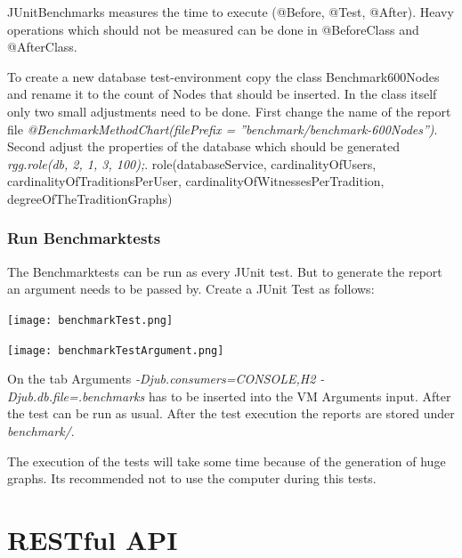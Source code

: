 \documentclass[11pt,fleqn,openany]{book} %
\begin{document}
\begin{remark}
JUnitBenchmarks measures the time to execute (@Before, @Test, @After). Heavy operations which should not be measured can be done in @BeforeClass and @AfterClass.
\end{remark}

To create a new database test-environment copy the class Benchmark600Nodes and rename it to the count of Nodes that should be inserted. In the class itself only two small adjustments need to be done. First change the name of the report file \textit{@BenchmarkMethodChart(filePrefix = ''benchmark/benchmark-600Nodes'')}. Second adjust the properties of the database which should be generated \textit{rgg.role(db, 2, 1, 3, 100);}. role(databaseService, cardinalityOfUsers, cardinalityOfTraditionsPerUser, cardinalityOfWitnessesPerTradition, degreeOfTheTraditionGraphs)

\section*{Run Benchmarktests}
The Benchmarktests can be run as every JUnit test. But to generate the report an argument needs to be passed by. 
Create a JUnit Test as follows:

\begin{center}
\texttt{[image: benchmarkTest.png]} 
\end{center}

\begin{center}
\texttt{[image: benchmarkTestArgument.png]} 
\end{center}

On the tab Arguments \textit{-Djub.consumers=CONSOLE,H2 -Djub.db.file=.benchmarks} has to be inserted into the VM Arguments input. After the test can be run as usual. After the test execution the reports are stored under \textit{benchmark/}.
 
\begin{remark}
The execution of the tests will take some time because of the generation of huge graphs. Its recommended not to use the computer during this tests.  
\end{remark}



\part{RESTful API}
\end{document}
